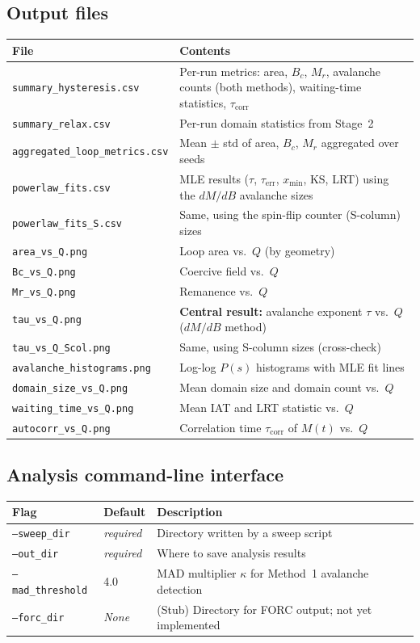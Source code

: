 \documentclass[11pt,a4paper]{article}
\newcommand{\file}[1]{\texttt{#1}}
\newcommand{\param}[1]{\texttt{--#1}}
\begin{document}
\subsection{Output files}

\begin{longtable}{p{5.5cm}p{9.5cm}}
\toprule
File & Contents \\
\midrule
\endhead
\file{summary\_hysteresis.csv} & Per-run metrics: area, $B_c$, $M_r$,
  avalanche counts (both methods), waiting-time statistics, $\tau_{\mathrm{corr}}$ \\
\file{summary\_relax.csv} & Per-run domain statistics from Stage~2 \\
\file{aggregated\_loop\_metrics.csv} & Mean $\pm$ std of area, $B_c$, $M_r$
  aggregated over seeds \\
\file{powerlaw\_fits.csv} & MLE results ($\tau$, $\tau_{\mathrm{err}}$, $x_{\min}$, KS,
  LRT) using the $dM/dB$ avalanche sizes \\
\file{powerlaw\_fits\_S.csv} & Same, using the spin-flip counter (S-column) sizes \\
\file{area\_vs\_Q.png} & Loop area vs.\ $Q$ (by geometry) \\
\file{Bc\_vs\_Q.png} & Coercive field vs.\ $Q$ \\
\file{Mr\_vs\_Q.png} & Remanence vs.\ $Q$ \\
\file{tau\_vs\_Q.png} & \textbf{Central result:} avalanche exponent $\tau$ vs.\ $Q$
  ($dM/dB$ method) \\
\file{tau\_vs\_Q\_Scol.png} & Same, using S-column sizes (cross-check) \\
\file{avalanche\_histograms.png} & Log-log $P(s)$ histograms with MLE fit lines \\
\file{domain\_size\_vs\_Q.png} & Mean domain size and domain count vs.\ $Q$ \\
\file{waiting\_time\_vs\_Q.png} & Mean IAT and LRT statistic vs.\ $Q$ \\
\file{autocorr\_vs\_Q.png} & Correlation time $\tau_{\mathrm{corr}}$ of $M(t)$ vs.\ $Q$ \\
\bottomrule
\end{longtable}

\subsection{Analysis command-line interface}

\begin{tabular}{p{4cm}p{2.2cm}p{8.5cm}}
\toprule
Flag & Default & Description \\
\midrule
\param{sweep\_dir} & \textit{required} & Directory written by a sweep script \\
\param{out\_dir} & \textit{required} & Where to save analysis results \\
\param{mad\_threshold} & 4.0 & MAD multiplier $\kappa$ for Method~1 avalanche detection \\
\param{forc\_dir} & \textit{None} & (Stub) Directory for FORC output; not yet implemented \\
\bottomrule
\end{tabular}
\end{document}
